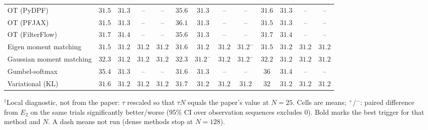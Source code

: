\begin{table}[ht]
\begin{adjustbox}{max width=\linewidth}
\begin{tabular}{lcccc|cccc|cccc}
OT (PyDPF) & $\mathbf{31.5}$ & $31.3$ & -- & -- & $35.6$ & $\mathbf{31.3}$ & -- & -- & $31.6$ & $31.3$ & -- & -- \\
OT (PFJAX) & $31.5$ & $31.3$ & -- & -- & $36.1$ & $\mathbf{31.3}$ & -- & -- & $\mathbf{31.5}$ & $31.3$ & -- & -- \\
OT (FilterFlow) & $\mathbf{31.7}$ & $31.4$ & -- & -- & $35.6$ & $\mathbf{31.3}$ & -- & -- & $31.7$ & $31.4$ & -- & -- \\
Eigen moment matching & $31.5$ & $\mathbf{31.2}$ & $\mathbf{31.2}$ & $\mathbf{31.2}$ & $31.6$ & $31.2$ & $31.2$ & $31.2^{-}$ & $\mathbf{31.5}$ & $31.2$ & $31.2$ & $31.2$ \\
Gaussian moment matching & $32.3$ & $31.2$ & $31.2$ & $\mathbf{31.2}$ & $32.3$ & $31.2^{-}$ & $31.2$ & $31.2^{-}$ & $\mathbf{32.2}$ & $\mathbf{31.2}$ & $\mathbf{31.2}$ & $\mathbf{31.2}$ \\
Gumbel-softmax & $35.4$ & $31.3$ & -- & -- & $\mathbf{31.6}$ & $\mathbf{31.3}$ & -- & -- & $36$ & $31.4$ & -- & -- \\
Variational (KL) & $\mathbf{31.6}$ & $31.2$ & $31.2$ & $\mathbf{31.2}$ & $31.7$ & $31.2$ & $31.2$ & $31.2$ & $32$ & $\mathbf{31.2}$ & $\mathbf{31.2}$ & $31.2$ \\
\bottomrule
\end{tabular}
\end{adjustbox}
\par\smallskip\parbox{0.95\linewidth}{\footnotesize $^\dagger$Local diagnostic, not from the paper: $\tau$ rescaled so that $\tau N$ equals the paper's value at $N{=}25$. Cells are means; $^{+}$/$^{-}$: paired difference from $E_2$ on the same trials significantly better/worse (95\% CI over observation sequences excludes 0). Bold marks the best trigger for that method and $N$. A dash means not run (dense methods stop at $N{=}128$).}
\end{table}


